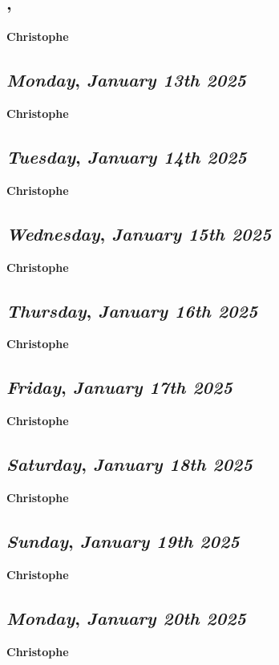 \subsection*{\weekday, \day}
\textbf {Christophe}

\def\day{\textit{January 13th 2025}}
\def\weekday{\textit{Monday}}
\subsection*{\weekday, \day}
\textbf {Christophe}

\def\day{\textit{January 14th 2025}}
\def\weekday{\textit{Tuesday}}
\subsection*{\weekday, \day}
\textbf {Christophe}

\def\day{\textit{January 15th 2025}}
\def\weekday{\textit{Wednesday}}
\subsection*{\weekday, \day}
\textbf {Christophe}

\def\day{\textit{January 16th 2025}}
\def\weekday{\textit{Thursday}}
\subsection*{\weekday, \day}
\textbf {Christophe}

\def\day{\textit{January 17th 2025}}
\def\weekday{\textit{Friday}}
\subsection*{\weekday, \day}
\textbf {Christophe}

\def\day{\textit{January 18th 2025}}
\def\weekday{\textit{Saturday}}
\subsection*{\weekday, \day}
\textbf {Christophe}

\def\day{\textit{January 19th 2025}}
\def\weekday{\textit{Sunday}}
\subsection*{\weekday, \day}
\textbf {Christophe}

\def\day{\textit{January 20th 2025}}
\def\weekday{\textit{Monday}}
\subsection*{\weekday, \day}
\textbf {Christophe}


